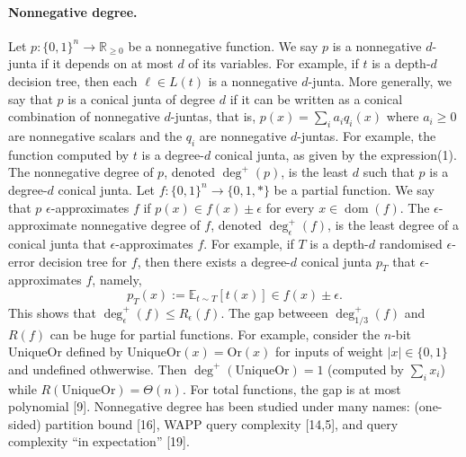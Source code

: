 \paragraph{Nonnegative degree.} Let $p:\{0,1\}^n\to\mathbb R_{\ge0}$ be a nonnegative function. We say $p$ is a nonnegative $d$-junta if it depends on at most $d$ of its variables. For example, if $t$ is a depth-$d$ decision tree, then each $\ell\in L(t)$ is a nonnegative $d$-junta. More generally, we say that $p$ is a conical junta of degree $d$ if it can be written as a conical combination of nonnegative $d$-juntas, that is, $p(x)=\sum_i a_iq_i(x)$ where $a_i\ge0$ are nonnegative scalars and the $q_i$ are nonnegative $d$-juntas. For example, the function computed by $t$ is a degree-$d$ conical junta, as given by the expression(1). The nonnegative degree of $p$, denoted $\deg^+(p)$, is the least $d$ such that $p$ is a degree-$d$ conical junta.
Let $f:\{0,1\}^n\to\{0,1,*\}$ be a partial function. We say that $p$ $\epsilon$-approximates $f$ if $p(x)\in f(x)\pm\epsilon$ for every $x\in\operatorname{dom}(f)$. The $\epsilon$-approximate nonnegative degree of $f$, denoted $\deg^+_\epsilon(f)$, is the least degree of a conical junta that $\epsilon$-approximates $f$. For example, if $T$ is a depth-$d$ randomised $\epsilon$-error decision tree for $f$, then there exists a degree-$d$ conical junta $p_T$ that $\epsilon$-approximates $f$, namely,
\[p_T(x):=\mathbb E_{t\sim T}[t(x)]\in f(x)\pm\epsilon.\]
This shows that $\deg^+_\epsilon(f)\le R_\epsilon(f)$. The gap betweeen $\deg^+_{1/3}(f)$ and $R(f)$ can be huge for partial functions. For example, consider the $n$-bit UniqueOr defined by $\mathrm{UniqueOr}(x)=\mathrm{Or}(x)$ for inputs of weight $|x|\in\{0,1\}$ and undefined othwerwise. Then $\deg^+(\mathrm{UniqueOr})=1$ (computed by $\sum_ix_i$) while $R(\mathrm{UniqueOr})=\Theta(n)$. For total functions, the gap is at most polynomial [9].
Nonnegative degree has been studied under many names: (one-sided) partition bound [16], WAPP query complexity [14,5], and query complexity ``in expectation'' [19].
